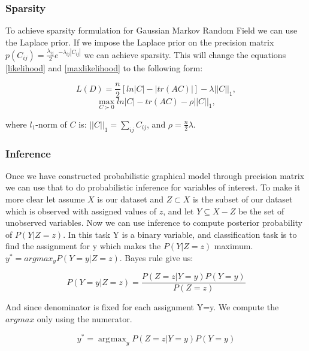 \documentclass{article} %
\DeclareMathOperator*{\argmax}{\arg\!\max}
\begin{document}
\subsubsection{Sparsity}
To achieve sparsity formulation for Gaussian Markov Random Field we can use 
the Laplace prior. If we impose the Laplace prior on the precision matrix 
$p(C_{ij}) = \frac{\lambda_{ij}}{2} e^{-\lambda_{ij}|C_{ij}|} $ we can 
achieve sparsity. This will change the equations \eqref{likelihood} and 
\eqref{maxlikelihood} to the following form:

\begin{multicols}{2}
\begin{equation}
L(D) = \frac{n}{2} [ln|C| -  |tr(AC)|] - \lambda||C||_{1}, 
\end{equation}\break
\begin{equation}
\max_{C\succ0} ln|C| - tr(AC) - \rho||C||_{1},
\end{equation}
\end{multicols}

where $l_{1}$-norm of $C$ is: $||C||_{1}= \sum_{ij}C_{ij}$, and $\rho=\frac{n}{2}\lambda $. \\


\subsubsection{Inference}
Once we have constructed probabilistic graphical model through precision 
matrix we can use that to do probabilistic inference for variables of 
interest. To make it more clear let assume $X$ is our dataset and 
$Z \subset X$ is the subset of our dataset which is observed with 
assigned values of $z$, and let $Y \subseteq X - Z$ be the set of unobserved 
variables. Now we can use inference to compute posterior probability of 
$P(Y|Z=z)$. In this task Y is a binary variable, and classification task is 
to find the assignment for y which makes the $P(Y|Z=z)$ maximum. 
$y^* = argmax_{y} P(Y=y|Z=z)$. Bayes rule give us: 

\begin{equation}
P(Y=y|Z=z) = \frac{P(Z=z|Y=y)P(Y=y)}{P(Z=z)}
\end{equation}  

And since denominator is fixed for each assignment Y=y. We compute the $argmax$ only using the numerator. 

\begin{equation}\label{argmax}
y^* = \argmax_{y} P(Z=z|Y=y)P(Y=y) 
\end{equation} 
\end{document}
